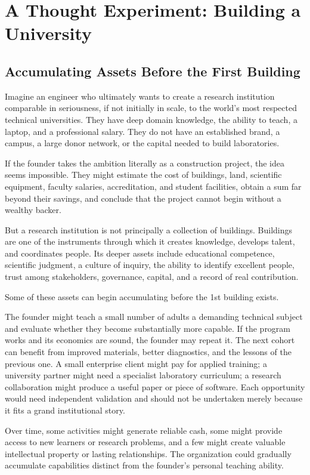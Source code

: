 \section{A Thought Experiment: Building a University}

\subsection{Accumulating Assets Before the First Building}

Imagine an engineer who ultimately wants to create a research institution comparable in seriousness, if not initially in scale, to the world's most respected technical universities. They have deep domain knowledge, the ability to teach, a laptop, and a professional salary. They do not have an established brand, a campus, a large donor network, or the capital needed to build laboratories.

If the founder takes the ambition literally as a construction project, the idea seems impossible. They might estimate the cost of buildings, land, scientific equipment, faculty salaries, accreditation, and student facilities, obtain a sum far beyond their savings, and conclude that the project cannot begin without a wealthy backer.

But a research institution is not principally a collection of buildings. Buildings are one of the instruments through which it creates knowledge, develops talent, and coordinates people. Its deeper assets include educational competence, scientific judgment, a culture of inquiry, the ability to identify excellent people, trust among stakeholders, governance, capital, and a record of real contribution.

Some of these assets can begin accumulating before the 1st building exists.

The founder might teach a small number of adults a demanding technical subject and evaluate whether they become substantially more capable. If the program works and its economics are sound, the founder may repeat it. The next cohort can benefit from improved materials, better diagnostics, and the lessons of the previous one. A small enterprise client might pay for applied training; a university partner might need a specialist laboratory curriculum; a research collaboration might produce a useful paper or piece of software. Each opportunity would need independent validation and should not be undertaken merely because it fits a grand institutional story.

Over time, some activities might generate reliable cash, some might provide access to new learners or research problems, and a few might create valuable intellectual property or lasting relationships. The organization could gradually accumulate capabilities distinct from the founder's personal teaching ability.


